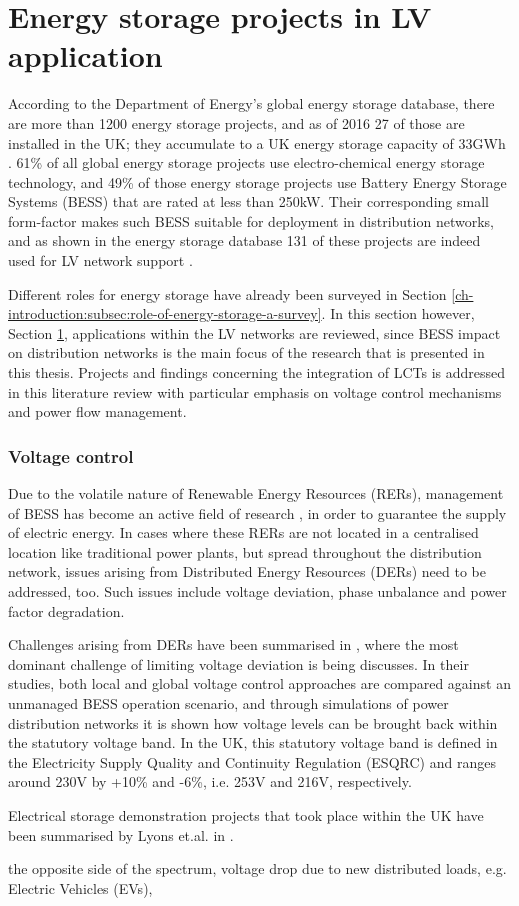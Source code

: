 \section{Energy storage projects in LV application}
\label{ch-literature:sec:energy-storage}

According to the Department of Energy's global energy storage database, there are more than 1200 energy storage projects, and as of 2016 27 of those are installed in the UK; they accumulate to a UK energy storage capacity of 33GWh \cite{Garton2016}.
61\% of all global energy storage projects use electro-chemical energy storage technology, and 49\% of those energy storage projects use Battery Energy Storage Systems (BESS) that are rated at less than 250kW.
Their corresponding small form-factor makes such BESS suitable for deployment in distribution networks, and as shown in the energy storage database 131 of these projects are indeed used for LV network support \cite{DOE-GESD}.

Different roles for energy storage have already been surveyed in Section \ref{ch-introduction:subsec:role-of-energy-storage-a-survey}. 
In this section however, Section \ref{ch-literature:sec:energy-storage}, applications within the LV networks are reviewed, since BESS impact on distribution networks is the main focus of the research that is presented in this thesis.
Projects and findings concerning the integration of LCTs is addressed in this literature review with particular emphasis on voltage control mechanisms and power flow management.

\subsubsection{Voltage control}


Due to the volatile nature of Renewable Energy Resources (RERs), management of BESS has become an active field of research \cite{Grillo2012, Rowe2014a, Li2016, Hosseina2016a}, in order to guarantee the supply of electric energy.
In cases where these RERs are not located in a centralised location like traditional power plants, but spread throughout the distribution network, issues arising from Distributed Energy Resources (DERs) need to be addressed, too.
Such issues include voltage deviation, phase unbalance and power factor degradation.

Challenges arising from DERs have been summarised in \cite{Ferreira2013a, Bravo2015}, where the most dominant challenge of limiting voltage deviation is being discusses.
In their studies, both local and global voltage control approaches are compared against an unmanaged BESS operation scenario, and through simulations of power distribution networks it is shown how voltage levels can be brought back within the statutory voltage band.
In the UK, this statutory voltage band is defined in the Electricity Supply Quality and Continuity Regulation (ESQRC) and ranges around 230V by +10\% and -6\%, i.e. 253V and 216V, respectively.

Electrical storage demonstration projects that took place within the UK have been summarised by Lyons et.al. in \cite{Lyons2015a}.


the opposite side of the spectrum, voltage drop due to new distributed loads, e.g. Electric Vehicles (EVs), 


